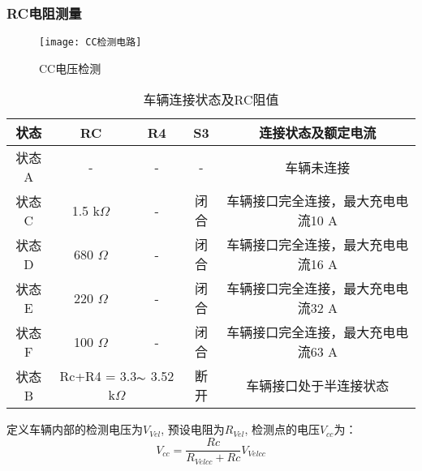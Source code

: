         \subsubsection*{RC电阻测量}
            \begin{figure}[H]
                \centering
                \texttt{[image: CC检测电路]}
                \caption{CC电压检测}
                \label{fig:C13}
            \end{figure}


        \begin{table}[!htbp]
            \renewcommand{\arraystretch}{1.3}
            \centering
            \caption{车辆连接状态及RC阻值}
            \begin{tabular}{ccccc}   
                 \toprule
                 状态  & RC  & R4 & S3 & 连接状态及额定电流\\    
                 \midrule
                 状态A  & -  & - & - &  车辆未连接 \\
                 状态C  & 1.5 k$\Omega$  & - & 闭合 &  车辆接口完全连接，最大充电电流10 A \\
                 状态D  & 680 $\Omega$  & - &  闭合 &  车辆接口完全连接，最大充电电流16 A  \\
                 状态E  & 220 $\Omega$ & - &   闭合 &  车辆接口完全连接，最大充电电流32 A  \\
                 状态F  & 100 $\Omega$ & - &   闭合 &  车辆接口完全连接，最大充电电流63 A  \\
                 状态B  & \multicolumn{2}{c}{Rc+R4 = 3.3$\thicksim$ 3.52 k$\Omega$} & 断开 &车辆接口处于半连接状态\\
                 \bottomrule
            \end{tabular}
            \label{tab:RC1}
       \end{table}
       定义车辆内部的检测电压为$V_{Vel}$, 预设电阻为$R_{Vel}$, 检测点的电压$V_{cc}$为：
            \begin{equation}
                V_{cc} = \frac{Rc}{R_{Velcc}+Rc} V_{Velcc}
            \end{equation}

